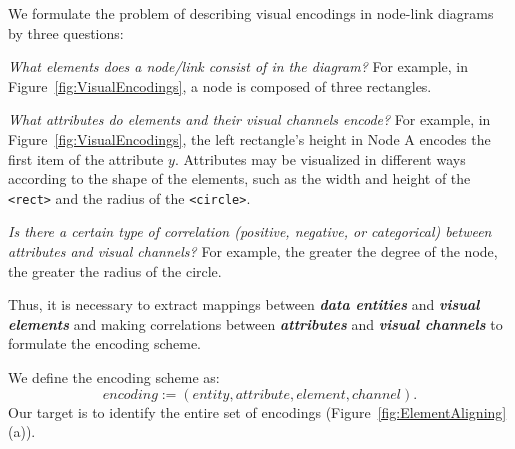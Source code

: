 We formulate the problem of describing visual encodings in node-link diagrams by three questions:
\begin{compactenum}[\textbf{Q}1]
    \item \textit{What elements does a node/link consist of in the diagram?} 
    For example, in Figure~\ref{fig:VisualEncodings}, a node is composed of three rectangles. \label{qstn:composition}
    
    \item \textit{What attributes do elements and their visual channels encode?} 
    For example, in Figure~\ref{fig:VisualEncodings}, the left rectangle's height in Node A encodes the first item of the attribute $y$. 
    Attributes may be visualized in different ways according to the shape of the elements, such as the width and height of the \texttt{<rect>} and the radius of the \texttt{<circle>}.\label{qstn:encodings}
    
    \item \textit{Is there a certain type of correlation (positive, negative, or categorical) between attributes and visual channels?}
    For example, the greater the degree of the node, the greater the radius of the circle.\label{qstn:correlation}
\end{compactenum}
Thus, it is necessary to extract mappings between \textbf{\textit{data entities}} and \textbf{\textit{visual elements}} and making correlations between \textbf{\textit{attributes}} and \textbf{\textit{visual channels}} to formulate the encoding scheme.

We define the encoding scheme as:
\begin{equation}
encoding := (entity, attribute, element, channel).
\end{equation}
Our target is to identify the entire set of encodings (Figure~\ref{fig:ElementAligning} (a)).

